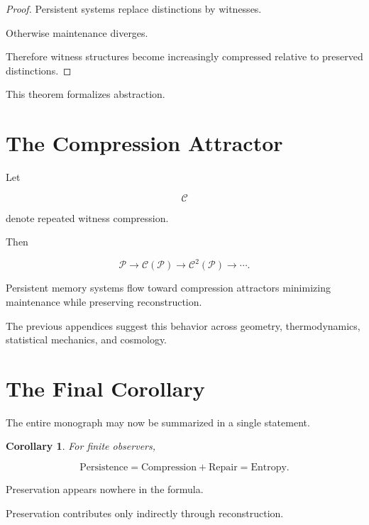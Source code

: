 \documentclass[12pt,oneside]{book}
\theoremstyle{plain} \newtheorem{theorem}{Theorem}[chapter] \newtheorem{lemma}[theorem]{Lemma} \newtheorem{proposition}[theorem]{Proposition} \newtheorem{corollary}[theorem]{Corollary}
\theoremstyle{definition} \newtheorem{definition}[theorem]{Definition} \newtheorem{axiom}[theorem]{Axiom} \newtheorem{construction}[theorem]{Construction}
\theoremstyle{remark} \newtheorem{remark}[theorem]{Remark} \newtheorem{example}[theorem]{Example}
\begin{document}
\begin{proof}

Persistent systems replace distinctions by witnesses.

Otherwise maintenance diverges.

Therefore witness structures become increasingly compressed relative to preserved distinctions.

\end{proof}

This theorem formalizes abstraction.

\section{The Compression Attractor}

Let

\[
\mathcal C
\]

denote repeated witness compression.

Then

\[
\mathcal P
\rightarrow
\mathcal C(\mathcal P)
\rightarrow
\mathcal C^2(\mathcal P)
\rightarrow
\cdots.
\]

\begin{conjecture}

Persistent memory systems flow toward compression attractors minimizing maintenance while preserving reconstruction.

\end{conjecture}

The previous appendices suggest this behavior across geometry, thermodynamics, statistical mechanics, and cosmology.

\section{The Final Corollary}

The entire monograph may now be summarized in a single statement.

\begin{corollary}

For finite observers,

\[
\text{Persistence}
=
\text{Compression}
+
\text{Repair}
=
\text{Entropy}.
\]

\end{corollary}

Preservation appears nowhere in the formula.

Preservation contributes only indirectly through reconstruction.
\end{document}
